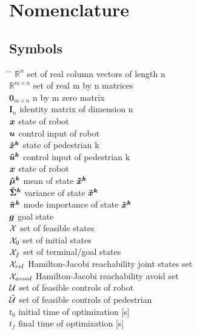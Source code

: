 \chapter*{Nomenclature}

\section*{Symbols}
\begin{tabbing}
\hspace*{1.6cm} \= \hspace*{8cm} \= \kill
$\mathbb{R}^n$ \> set of real column vectors of length n \\[0.5ex]
$\mathbb{R}^{m \times n}$ \> set of real m by n matrices \\[0.5ex]
$\mathbf{0}_{m \times n}$ \> n by m zero matrix \\[0.5ex]
$\mathbf{I}_n$ \> identity matrix of dimension n \\[0.5ex]
$\boldsymbol{x}$ \> state of robot \\[0.5ex]
$\boldsymbol{u}$ \> control input of robot \\[0.5ex]
$\xped[k]$ \> state of pedestrian k \\[0.5ex]
$\uped[k]$ \> control input of pedestrian k \\[0.5ex]
$\boldsymbol{x}$ \> state of robot \\[0.5ex]
$\muped[k]$ \> mean of state $\xped[k]$ \\[0.5ex]
$\sigmaped[k]$ \> variance of state $\xped[k]$ \\[0.5ex]
$\piped[k]$ \> mode importance of state $\xped[k]$ \\[0.5ex]
$\boldsymbol{g}$ \> goal state \\[0.5ex]
$\mathcal{X}$ \> set of feasible states \\[0.5ex]
$\mathcal{X}_0$ \> set of initial states \\[0.5ex]
$\mathcal{X}_f$ \> set of terminal/goal states \\[0.5ex]
$\mathcal{X}_{rel}$ \> Hamilton-Jacobi reachability joint states set \\[0.5ex]
$\mathcal{X}_{avoid}$ \> Hamilton-Jacobi reachability avoid set \\[0.5ex]
$\mathcal{U}$ \> set of feasible controls of robot \\[0.5ex]
$\mathcal{\tilde{U}}$ \> set of feasible controls of pedestrian \\[0.5ex]
$t_0$ \> initial time of optimization [s] \\[0.5ex]
$t_f$ \> final time of optimization [s] \\[0.5ex]

\end{tabbing}
